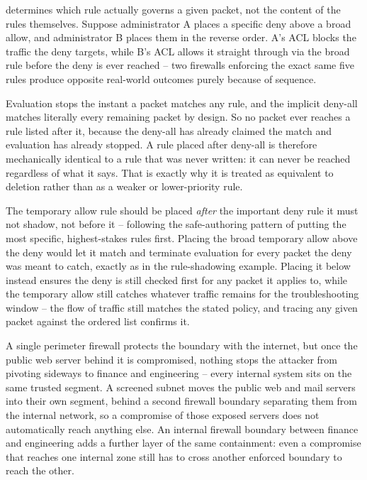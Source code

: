 \begin{answerkey}
determines which rule actually governs a given packet, not the content of the rules themselves.
Suppose administrator A places a specific deny above a broad allow, and administrator B places them
in the reverse order. A's ACL blocks the traffic the deny targets, while B's ACL allows it straight
through via the broad rule before the deny is ever reached -- two firewalls enforcing the exact same
five rules produce opposite real-world outcomes purely because of sequence.
\item Evaluation stops the instant a packet matches any rule, and the implicit deny-all matches
literally every remaining packet by design. So no packet ever reaches a rule listed after it,
because the deny-all has already claimed the match and evaluation has already stopped. A rule
placed after deny-all is therefore mechanically identical to a rule that was never written: it can
never be reached regardless of what it says. That is exactly why it is treated as equivalent to
deletion rather than as a weaker or lower-priority rule.
\item The temporary allow rule should be placed \emph{after} the important deny rule it must not
shadow, not before it -- following the safe-authoring pattern of putting the most specific,
highest-stakes rules first. Placing the broad temporary allow above the deny would let it match and
terminate evaluation for every packet the deny was meant to catch, exactly as in the
rule-shadowing example. Placing it below instead ensures the deny is still checked first for any
packet it applies to, while the temporary allow still catches whatever traffic remains for the
troubleshooting window -- the flow of traffic still matches the stated policy, and tracing any given
packet against the ordered list confirms it.
\item A single perimeter firewall protects the boundary with the internet, but once the public web
server behind it is compromised, nothing stops the attacker from pivoting sideways to finance and
engineering -- every internal system sits on the same trusted segment. A screened subnet moves the
public web and mail servers into their own segment, behind a second firewall boundary separating
them from the internal network, so a compromise of those exposed servers does not automatically
reach anything else. An internal firewall boundary between finance and engineering adds a further
layer of the same containment: even a compromise that reaches one internal zone still has to cross
another enforced boundary to reach the other.
\end{answerkey}
